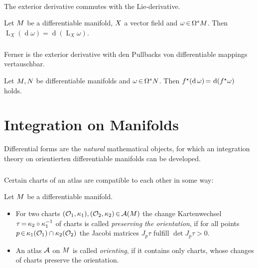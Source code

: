 \documentclass[11pt,twoside]{article}
\begin{document}
\paragraph{}
The exterior derivative commutes with the Lie-derivative.

\begin{theorem}
Let $\difM$ be a differentiable manifold,
$\vecX$ a vector field and $\omega \xeof \Omega^s \difM$.
Then
$\operatorname{L}_X (\operatorname{d}   \omega) =
 \operatorname{d}   (\operatorname{L}_X \omega)$.
\end{theorem}

\subparagraph{}
Ferner is the exterior derivative with den Pullbacks
von differentiable mappings vertauschbar.

\begin{theorem}
Let $\difM,\difN$ be differentiable manifolds and
$\omega \xeof \Omega^s \difN$.
Then 
$f^\* (\operatorname{d} \omega) \eq \operatorname{d} (f^\* \omega)$
holds.
\end{theorem}

\section{Integration on Manifolds}
Differential forms are the \textit{natural} mathematical objects,
for which an integration theory on orientierten differentiable
manifolds can be developed.

\subparagraph{}
Certain charts of an atlas are compatible to each other in some way:

\begin{definition}
Let $\difM$ be a differentiable manifold.

\begin{itemize}[leftmargin=15pt]
\item[1.]
For two charts $(\Off_1,\kappa_1),(\Off_2,\kappa_2) \xeof \cal{A}(\difM)$
the change  Kartenwechsel $\tau \eq \kappa_2 \circ \kappa_1^{-1}$ of charts
is called \textit{preserving the orientation},
if for all points $p \xeof \kappa_1(\Off_1) \cap \kappa_2(\Off_2)$ the
Jacobi matrices $J_p \tau$ fulfill $\operatorname{det} J_p \tau > 0$.

\item[2.]
An atlas $\cal{A}$ on $\difM$ is called \textit{orienting},
if it contains only charts,
whose changes of charts preserve the orientation.
\end{itemize}
\end{definition}
\end{document}
